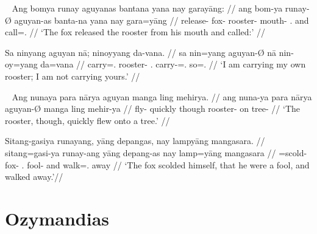 \xe

\pex~ %
\a\begingl
	\gla Ang bomya runay aguyanas bantana yana nay garayāng: //
	\glb ang bom-ya runay-Ø aguyan-as banta-na yana nay gara=yāng //
	\glc \AgtT{} release-\TsgM{} fox-\Top{} rooster-\Parg{} mouth-\Gen{}
		\TsgM{}.\Gen{} and call=\TsgM{}.\Aarg{} //
	\glft `The fox released the rooster from his mouth and called:' //
\endgl

\a\begingl
	\gla Sa ninyang aguyan nā; ninoyyang da-vana. //
	\glb sa nin=yang aguyan-Ø nā nin-oy=yang da=vana //
	\glc \PatT{} carry=\Fsg{}.\Aarg{} rooster-\Top{} \Fsg{}.\Gen{}
		carry-\Neg{}=\Fsg{}.\Aarg{} so=\Spl{}.\Gen{} //
	\glft `I am carrying my own rooster; I am not carrying yours.' //
\endgl

\xe

\pex~ %
\a\begingl
	\gla Ang nunaya para nārya aguyan manga ling mehirya. //
	\glb ang nuna-ya para nārya aguyan-Ø manga ling mehir-ya //
	\glc \AgtT{} fly-\TsgM{} quickly though rooster-\Top{} \Dyn{} on
		tree-\Loc{} //
	\glft `The rooster, though, quickly flew onto a tree.' //
\endgl

\a\label{ex:objpred}\begingl
	\gla Sitang-gasiya runayang, yāng depangas, nay lampyāng mangasara. //
	\glb sitang=gasi-ya runay-ang yāng depang-as nay lamp=yāng mangasara //
	\glc \Refl{}=scold-\TsgM{} fox-\Aarg{} \TsgM{}.\Aarg{} fool-\Parg{} and
		walk=\TsgM{}.\Aarg{} away //
	\glft `The fox scolded himself, that he were a fool, and walked 
		away.'\footnotemark //
\endgl

\xe


\section{Ozymandias}
\label{sec:ozymandias}


\citep[Adapted from][]{becker:ozymandias}\medskip

